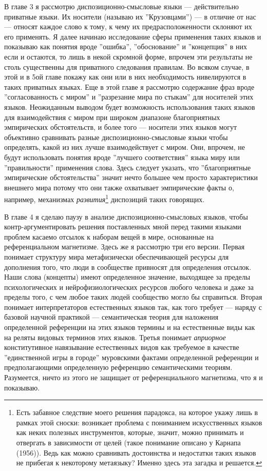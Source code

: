 \documentclass[11pt]{book}
\begin{document}
В главе 3 я рассмотрю диспозиционно-смысловые языки --- действительно приватные языки. Их носители (называю их ''Крузовцами'') --- в отличие от нас --- относят каждое слово к тому, к чему их предрасположенности склоняют их его применять. Я далее начинаю исследование сферы применения таких языков и показываю как понятия вроде ''ошибка'', ''обоснование'' и ''концепция'' в них если и остаются, то лишь в некой скромной форме, впрочем эти результаты не столь существенны для приватного следования правилам. Во всяком случае, в этой и в 5ой главе покажу как они или в них необходимость нивелируются в таких приватных языках. Еще в этой главе я рассмотрю содержание фраз вроде ''согласованность с миром'' и ''разрезание мира по стыкам'' для носителей этих языков. Неожиданным выводом будет возможность использования таких языков для взаимодействия с миром при широком диапазоне благоприятных эмпирических обстоятельств, и более того --- носители этих языков могут объективно сравнивать разные диспозиционно-смысловые языки чтобы определять, какой из них лучше взаимодействует с миром. Они, впрочем, не будут использовать понятия вроде ''лучшего соответствия'' языка миру или ''правильности'' применения слова. Здесь следует указать, что ''благоприятные эмпирические обстоятельства'' значит нечто большее чем просто характеристики внешнего мира потому что они также охватывает эмпирические факты о, например, механизмах \textit{развития}\footnote{Есть забавное следствие моего решения парадокса, на которое укажу лишь в рамках этой сноски: возникает проблема с пониманием искусственных языков как неких полезных инструментов, которые, значит, можно принимать и отвергать в зависимости от целей (такое понимание описано у Карнапа (1956)). Ведь как можно сравнивать достоинства и недостатки таких языков не прибегая к некоторому метаязыку? Именно здесь эта загадка и решается.} диспозиций таких говорящих.

В главе 4 я сделаю паузу в анализе диспозиционно-смысловых языков, чтобы контр-аргументировать решения поставленных мной перед такими языками проблем касаемо отсылок к наборам вещей в мире, основанные на референциальном магнетизме. Здесь же я рассмотрю три его версии. Первая понимает структуру мира метафизически обеспечивающей ресурсы для дополнения того, что люди в сообществе привносят для определения отсылок. Наши слова (концепты) имеют определенное значение, выходящее за пределы психологических и нейрофизиологических ресурсов любого человека и даже за пределы того, с чем любое таких людей сообщество могло бы справиться. Вторая понимает интерпретаторов естественных языков так, как того требует --- наряду с базовой научной практикой --- семантическая теория для наложения определенной референции на этих языков термины и на естественные виды как на реляты видовых терминов этих языков. Третья понимает \textit{априорное} конститутивное навязывание естественных видов как требуемое в качестве ''единственной игры в городе'' муровскими фактами определенной референции и предполагающими определенную референцию семантическими теориям. Разумеется, ничто из этого не защищает от референциального магнетизма, что я и показываю.
\end{document}
